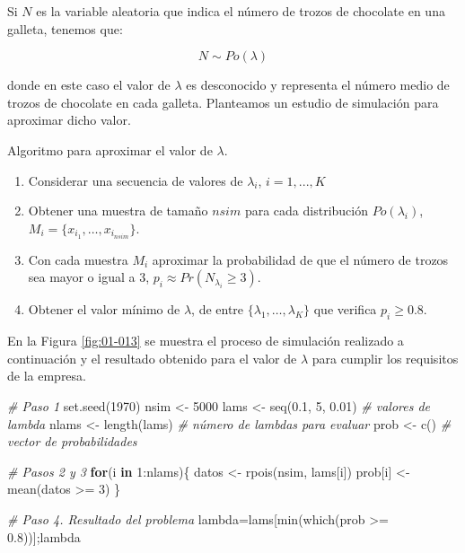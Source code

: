 \documentclass[
]{book}
\newenvironment{Shaded}{\begin{snugshade}}{\end{snugshade}}
\newcommand{\CommentTok}[1]{\textcolor[rgb]{0.56,0.35,0.01}{\textit{#1}}}
\newcommand{\ControlFlowTok}[1]{\textcolor[rgb]{0.13,0.29,0.53}{\textbf{#1}}}
\newcommand{\DecValTok}[1]{\textcolor[rgb]{0.00,0.00,0.81}{#1}}
\newcommand{\FloatTok}[1]{\textcolor[rgb]{0.00,0.00,0.81}{#1}}
\newcommand{\FunctionTok}[1]{\textcolor[rgb]{0.00,0.00,0.00}{#1}}
\newcommand{\NormalTok}[1]{#1}
\newcommand{\OtherTok}[1]{\textcolor[rgb]{0.56,0.35,0.01}{#1}}
\newcommand{\SpecialCharTok}[1]{\textcolor[rgb]{0.00,0.00,0.00}{#1}}
\providecommand{\tightlist}{%
  \setlength{\itemsep}{0pt}\setlength{\parskip}{0pt}}
\newenvironment{silverbox}{
  \definecolor{shadecolor}{rgb}{192, 192, 192}  
  \color{black}
  \begin{shaded}}
 {\end{shaded}}
\theoremstyle{definition}
\theoremstyle{definition}
\theoremstyle{definition}
\theoremstyle{definition}
\theoremstyle{remark}
\begin{document}
Si \(N\) es la variable aleatoria que indica el número de trozos de chocolate en una galleta, tenemos que:

\[N \sim Po(\lambda)\]

donde en este caso el valor de \(\lambda\) es desconocido y representa el número medio de trozos de chocolate en cada galleta. Planteamos un estudio de simulación para aproximar dicho valor.

\begin{silverbox}

Algoritmo para aproximar el valor de \(\lambda\).

\begin{enumerate}
\def\labelenumi{\arabic{enumi}.}
\tightlist
\item
  Considerar una secuencia de valores de \(\lambda_i\), \(i=1,...,K\)
\item
  Obtener una muestra de tamaño \(nsim\) para cada distribución \(Po(\lambda_i)\), \(M_i=\{x_{i_1},\ldots,x_{i_{nsim}}\}\).
\item
  Con cada muestra \(M_i\) aproximar la probabilidad de que el número de trozos sea mayor o igual a 3, \(p_i\approx Pr(N_{\lambda_i}\geq3)\).
\item
  Obtener el valor mínimo de \(\lambda\), de entre \(\{\lambda_1,\ldots,\lambda_K\}\) que verifica \(p_i \geq 0.8\).
\end{enumerate}

\end{silverbox}

En la Figura \ref{fig:01-013} se muestra el proceso de simulación realizado a continuación y el resultado obtenido para el valor de \(\lambda\) para cumplir los requisitos de la empresa.

\begin{Shaded}
\begin{Highlighting}[]
\CommentTok{\# Paso 1}
\FunctionTok{set.seed}\NormalTok{(}\DecValTok{1970}\NormalTok{)}
\NormalTok{nsim }\OtherTok{\textless{}{-}} \DecValTok{5000}
\NormalTok{lams }\OtherTok{\textless{}{-}} \FunctionTok{seq}\NormalTok{(}\FloatTok{0.1}\NormalTok{, }\DecValTok{5}\NormalTok{, }\FloatTok{0.01}\NormalTok{) }\CommentTok{\# valores de lambda}
\NormalTok{nlams }\OtherTok{\textless{}{-}} \FunctionTok{length}\NormalTok{(lams)     }\CommentTok{\# número de lambdas para evaluar}
\NormalTok{prob }\OtherTok{\textless{}{-}} \FunctionTok{c}\NormalTok{()  }\CommentTok{\# vector de probabilidades}

\CommentTok{\# Pasos 2 y 3}
\ControlFlowTok{for}\NormalTok{(i }\ControlFlowTok{in} \DecValTok{1}\SpecialCharTok{:}\NormalTok{nlams)\{}
\NormalTok{  datos }\OtherTok{\textless{}{-}} \FunctionTok{rpois}\NormalTok{(nsim, lams[i])    }
\NormalTok{  prob[i] }\OtherTok{\textless{}{-}} \FunctionTok{mean}\NormalTok{(datos }\SpecialCharTok{\textgreater{}=} \DecValTok{3}\NormalTok{)   }
\NormalTok{\}}

\CommentTok{\# Paso 4. Resultado del problema}
\NormalTok{lambda}\OtherTok{=}\NormalTok{lams[}\FunctionTok{min}\NormalTok{(}\FunctionTok{which}\NormalTok{(prob }\SpecialCharTok{\textgreater{}=} \FloatTok{0.8}\NormalTok{))];lambda}
\end{Highlighting}
\end{Shaded}
\end{document}
